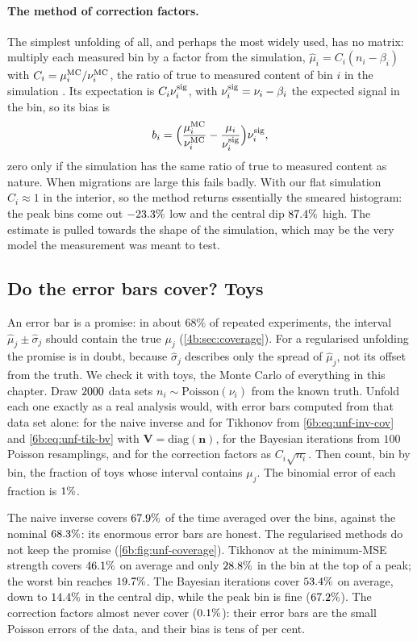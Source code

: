 \paragraph{The method of correction factors.} The simplest unfolding of all, and perhaps the most
widely used, has no matrix: multiply each measured bin by a factor from the simulation,
$\hat\mu_i=C_i(n_i-\beta_i)$ with $C_i=\mu_i^{\rm MC}/\nu_i^{\rm MC}$, the ratio of true to measured
content of bin $i$ in the simulation . Its expectation is
$C_i\nu_i^{\rm sig}$, with $\nu_i^{\rm sig}=\nu_i-\beta_i$ the expected signal in the bin, so its bias is
\[
  b_i=\Bigl(\frac{\mu_i^{\rm MC}}{\nu_i^{\rm MC}}-\frac{\mu_i}{\nu_i^{\rm sig}}\Bigr)\nu_i^{\rm sig},
\]
zero only if the simulation has the same ratio of true to measured content as nature. When
migrations are large this fails badly. With our flat simulation $C_i\approx1$ in the interior, so the
method returns essentially the smeared histogram: the peak bins come out $-23.3\%$
low and the central dip $87.4\%$ high. The estimate is pulled towards the shape of the
simulation, which may be the very model the measurement was meant to test.

\subsection{Do the error bars cover? Toys}
\label{6b:sec:unf-coverage}

An error bar is a promise: in about $68\%$ of repeated experiments, the interval
$\hat\mu_j\pm\hat\sigma_j$ should contain the true $\mu_j$ (\cref{4b:sec:coverage}). For a regularised
unfolding the promise is in doubt, because $\hat\sigma_j$ describes only the spread of $\hat\mu_j$, not
its offset from the truth. We check it with toys, the Monte Carlo of everything in this chapter.
Draw $2000$ data sets $n_i\sim\mathrm{Poisson}(\nu_i)$ from the known truth. Unfold each one
exactly as a real analysis would, with error bars computed from that data set alone: for the naive
inverse and for Tikhonov from \eqref{6b:eq:unf-inv-cov} and \eqref{6b:eq:unf-tik-bv} with
$\mathbf V=\mathrm{diag}(\bm n)$, for the Bayesian iterations from $100$ Poisson resamplings, and for
the correction factors as $C_i\sqrt{n_i}$. Then count, bin by bin, the fraction of toys whose
interval contains $\mu_j$. The binomial error of each fraction is $1\%$.

The naive inverse covers $67.9\%$ of the time averaged over the bins, against the
nominal $68.3\%$: its enormous error bars are honest. The regularised methods do not
keep the promise (\cref{6b:fig:unf-coverage}). Tikhonov at the minimum-MSE strength covers
$46.1\%$ on average and only $28.8\%$ in the bin at the top of a
peak; the worst bin reaches $19.7\%$. The Bayesian iterations cover
$53.4\%$ on average, down to $14.4\%$ in the central dip, while the peak
bin is fine ($67.2\%$). The correction factors almost never cover
($0.1\%$): their error bars are the small Poisson errors of the data, and their bias is
tens of per cent.

